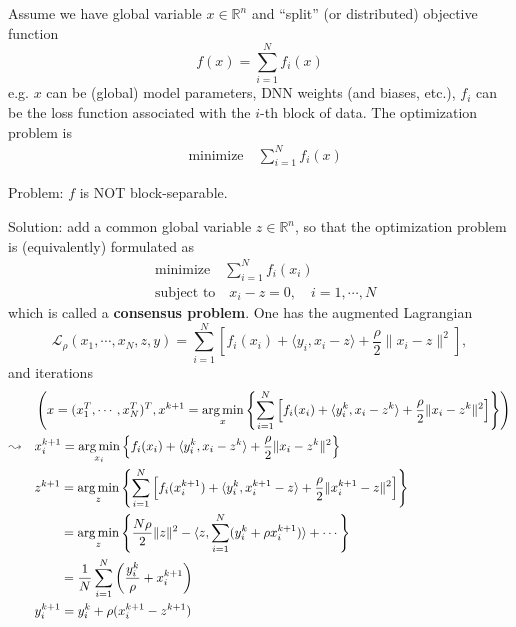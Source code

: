 Assume we have global variable $x \in \mathbb{R}^n$ and ``split'' (or distributed) objective function
$$f(x) = \sum\limits_{i=1}^N f_i(x)$$
e.g. $x$ can be (global) model parameters, DNN weights (and biases, etc.), $f_i$ can be the loss function associated with the $i$-th block of data. The optimization problem is
\begin{align*}
    & \text{minimize} \quad \sum\limits_{i=1}^N f_i(x)
\end{align*}

Problem: $f$ is NOT block-separable.

Solution: add a common global variable $z \in \mathbb{R}^n$, so that the optimization problem is (equivalently) formulated as
\begin{align*}
    & \text{minimize} \quad \sum\limits_{i=1}^N f_i(x_i) \\
    & \text{subject to} \quad x_i - z = 0, \quad i=1,\cdots,N
\end{align*}
which is called a {\bfseries consensus problem}. One has the augmented Lagrangian
$$\mathcal{L}_{\rho}(x_1,\cdots,x_N,z,y) = \sum\limits_{i=1}^N \left[ f_i(x_i) + \langle y_i, x_i-z \rangle + \dfrac{\rho}{2} \lVert x_i-z \rVert^2 \right],$$
and iterations
\begin{align*}
    \phantom{\leadsto} & \left( x = (x_1^T,\cdots,x_N^T)^T, x^{k+1} = \argmin_x \left\{ \sum\limits_{i=1}^N \left[ f_i(x_i) + \langle y^k_i, x_i-z^k \rangle + \dfrac{\rho}{2} \lVert x_i-z^k \rVert^2 \right] \right\} \right) \\
    \leadsto \quad & x_i^{k+1} = \argmin_{x_i} \left\{ f_i(x_i) + \langle y^k_i, x_i-z^k \rangle + \dfrac{\rho}{2} \lVert x_i-z^k \rVert^2 \right\} \\
    & z^{k+1} = \argmin_{z} \left\{ \sum\limits_{i=1}^N \left[ f_i(x_i^{k+1}) + \langle y^k_i, x_i^{k+1}-z \rangle + \dfrac{\rho}{2} \lVert x_i^{k+1}-z \rVert^2 \right] \right\} \\
    & \phantom{z^{k+1}} = \argmin_{z} \left\{ \dfrac{N\rho}{2} \lVert z \rVert^2 - \langle z, \sum\limits_{i=1}^N (y_i^k+\rho x_i^{k+1}) \rangle + \cdots \right\} \\
    & \phantom{z^{k+1}} = \dfrac{1}{N} \sum\limits_{i=1}^N \left( \dfrac{y_i^{k}}{\rho} + x_i^{k+1} \right) \\
    & y_i^{k+1} = y_i^k + \rho (x_i^{k+1} - z^{k+1})
\end{align*}

